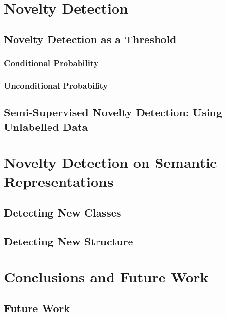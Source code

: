 \chapter{Novelty Detection}\label{chap:novelty-intro}
\section{Novelty Detection as a Threshold}
\subsection{Conditional Probability}
\subsection{Unconditional Probability}

\section{Semi-Supervised Novelty Detection: Using Unlabelled Data}

\chapter{Novelty Detection on Semantic Representations}\label{chap:novelty}
\section{Detecting New Classes} 
\section{Detecting New Structure}

\chapter{Conclusions and Future Work}\label{chap:conclusions}
\section{Future Work}

